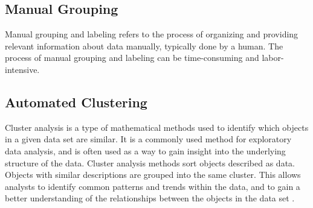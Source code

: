 \subsection{Manual Grouping}

Manual grouping and labeling refers to the process of organizing and
providing relevant information about data manually, typically done by a
human. The process of manual grouping and labeling can be time-consuming
and labor-intensive.




\subsection{Automated Clustering}

Cluster analysis is a type of mathematical methods used to identify which
objects in a given data set are similar. It is a commonly used method for
exploratory data analysis, and is often used as a way to gain insight into
the underlying structure of the data. Cluster analysis methods sort
objects described as data. Objects with similar descriptions are grouped
into the same cluster. This allows analysts to identify common patterns
and trends within the data, and to gain a better understanding of the
relationships between the objects in the data set
\parencite{romesburg1984cluster}.



